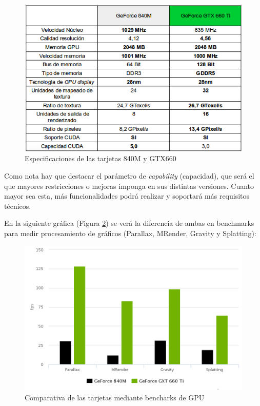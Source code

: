 \bigskip
\begin{figure}[h]
	\centering
	\includegraphics[width=1\linewidth]{../images/especificaciones}
	\caption[Especificaciones de las tarjetas 840M y GTX660]{Especificaciones de las tarjetas 840M y GTX660}
	\label{fig:especificaciones}
\end{figure}

\bigskip
Como nota hay que destacar el parámetro de \textit{capability} (capacidad), que será el que mayores restricciones o mejoras imponga en sus distintas versiones. Cuanto mayor sea esta, más funcionalidades podrá realizar y soportará más requisitos técnicos.

\bigskip
En la siguiente gráfica (Figura \ref{fig:grafico_benchmarks}) se verá la diferencia de ambas en benchmarks para medir procesamiento de gráficos (Parallax, MRender, Gravity y Splatting):

\begin{figure}[h]
	\centering
	\includegraphics[width=0.6\linewidth]{../images/grafico_benchmarks}
	\caption[Comparativa de las tarjetas mediante bencharks de GPU]{Comparativa de las tarjetas mediante bencharks de GPU}
	\label{fig:grafico_benchmarks}
\end{figure}



